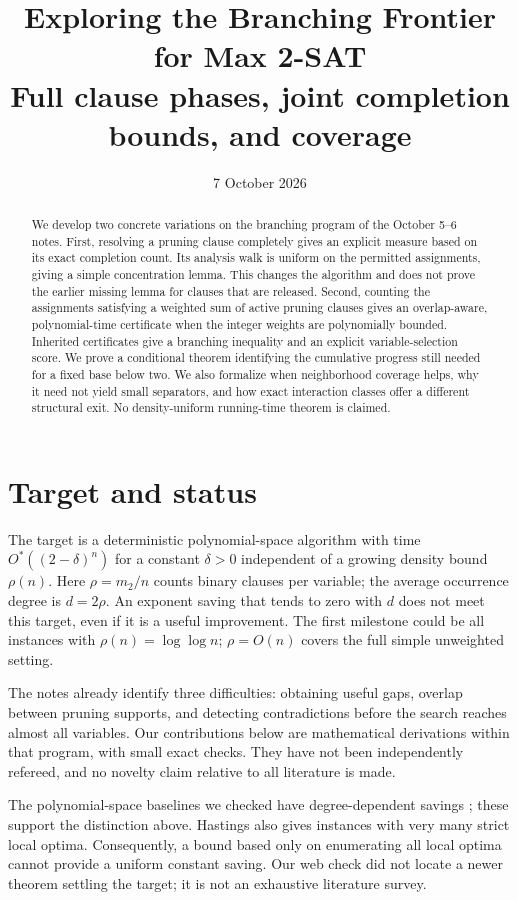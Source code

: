\documentclass[11pt,a4paper]{article}
\title{Exploring the Branching Frontier for Max 2-SAT\\
\large Full clause phases, joint completion bounds, and coverage}
\author{}
\date{7 October 2026}
\theoremstyle{remark}
\newcommand{\Ostar}{O^{*}}
\begin{document}
\maketitle

\begin{abstract}
We develop two concrete variations on the branching program of the October
5--6 notes. First, resolving a pruning clause completely gives an explicit
measure based on its exact completion count. Its analysis walk is uniform on
the permitted assignments, giving a simple concentration lemma. This changes
the algorithm and does not prove the earlier missing lemma for clauses that
are released. Second, counting the assignments satisfying a weighted sum of
active pruning clauses gives an overlap-aware, polynomial-time certificate
when the integer weights are polynomially bounded. Inherited certificates
give a branching inequality and an explicit variable-selection score. We
prove a conditional theorem identifying the cumulative progress still needed
for a fixed base below two. We also formalize when neighborhood coverage
helps, why it need not yield small separators, and how exact interaction
classes offer a different structural exit. No density-uniform running-time
theorem is claimed.
\end{abstract}

\section{Target and status}

The target is a deterministic polynomial-space algorithm with time
$\Ostar((2-\delta)^n)$ for a constant $\delta>0$ independent of a growing
density bound $\rho(n)$. Here $\rho=m_2/n$ counts binary clauses per variable;
the average occurrence degree is $d=2\rho$. An exponent saving that tends to
zero with $d$ does not meet this target, even if it is a useful improvement.
The first milestone could be all instances with $\rho(n)=\log\log n$;
$\rho=O(n)$ covers the full simple unweighted setting.

The notes already identify three difficulties: obtaining useful gaps,
overlap between pruning supports, and detecting contradictions before the
search reaches almost all variables. Our contributions below are mathematical
derivations within that program, with small exact checks. They have not been
independently refereed, and no novelty claim relative to all literature is made.

The polynomial-space baselines we checked have degree-dependent savings
\cite{Gol11,Has16}; these support the distinction above. Hastings also gives
instances with very many strict local optima. Consequently, a bound based only
on enumerating all local optima cannot provide a uniform constant saving.
Our web check did not locate a newer theorem settling the target; it is not
an exhaustive literature survey.
\end{document}
